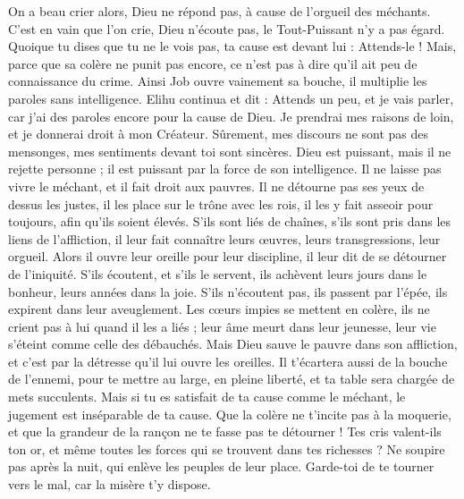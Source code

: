 \begin{multicols}{2}
On a beau crier alors, Dieu ne répond pas, à cause de l'orgueil des méchants.
C'est en vain que l'on crie, Dieu n'écoute pas, le Tout-Puissant n'y a pas égard.
Quoique tu dises que tu ne le vois pas, ta cause est devant lui : Attends-le !
Mais, parce que sa colère ne punit pas encore, ce n'est pas à dire qu'il ait peu de connaissance du crime.
Ainsi Job ouvre vainement sa bouche, il multiplie les paroles sans intelligence.
\VerseOne{}Elihu continua et dit :
Attends un peu, et je vais parler, car j'ai des paroles encore pour la cause de Dieu.
Je prendrai mes raisons de loin, et je donnerai droit à mon Créateur.
Sûrement, mes discours ne sont pas des mensonges, mes sentiments devant toi sont sincères.
Dieu est puissant, mais il ne rejette personne ; il est puissant par la force de son intelligence.
Il ne laisse pas vivre le méchant, et il fait droit aux pauvres.
Il ne détourne pas ses yeux de dessus les justes, il les place sur le trône avec les rois, il les y fait asseoir pour toujours, afin qu'ils soient élevés.
S'ils sont liés de chaînes, s'ils sont pris dans les liens de l'affliction,
il leur fait connaître leurs œuvres, leurs transgressions, leur orgueil.
Alors il ouvre leur oreille pour leur discipline, il leur dit de se détourner de l'iniquité.
S'ils écoutent, et s'ils le servent, ils achèvent leurs jours dans le bonheur, leurs années dans la joie.
S'ils n'écoutent pas, ils passent par l'épée, ils expirent dans leur aveuglement.
Les cœurs impies se mettent en colère, ils ne crient pas à lui quand il les a liés ;
leur âme meurt dans leur jeunesse, leur vie s'éteint comme celle des débauchés.
Mais Dieu sauve le pauvre dans son affliction, et c'est par la détresse qu'il lui ouvre les oreilles.
Il t'écartera aussi de la bouche de l'ennemi, pour te mettre au large, en pleine liberté, et ta table sera chargée de mets succulents.
Mais si tu es satisfait de ta cause comme le méchant, le jugement est inséparable de ta cause.
Que la colère ne t'incite pas à la moquerie, et que la grandeur de la rançon ne te fasse pas te détourner !
Tes cris valent-ils ton or, et même toutes les forces qui se trouvent dans tes richesses ?
Ne soupire pas après la nuit, qui enlève les peuples de leur place.
Garde-toi de te tourner vers le mal, car la misère t'y dispose.

\end{multicols}
